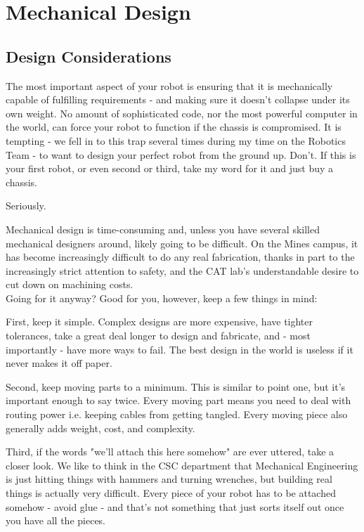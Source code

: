
\chapter{Mechanical Design}
\label{chap:MechDes}


\section{Design Considerations}
The most important aspect of your robot is ensuring that it is mechanically capable of fulfilling requirements - and making sure it doesn't collapse under its own weight. No amount of sophisticated code, nor the most powerful computer in the world, can force your robot to function if the chassis is compromised. It is tempting - we fell in to this trap several times during my time on the Robotics Team - to want to design your perfect robot from the ground up. Don't. If this is your first robot, or even second or third, take my word for it and just buy a chassis.

Seriously.

Mechanical design is time-consuming and, unless you have several skilled mechanical designers around, likely going to be difficult. On the Mines campus, it has become increasingly difficult to do any real fabrication, thanks in part to the increasingly strict attention to safety, and the CAT lab's understandable desire to cut down on machining costs.\\

Going for it anyway? Good for you, however, keep a few things in mind:

First, keep it simple. Complex designs are more expensive, have tighter tolerances, take a great deal longer to design and fabricate, and - most importantly - have more ways to fail. The best design in the world is useless if it never makes it off paper.

Second, keep moving parts to a minimum. This is similar to point one, but it's important enough to say twice. Every moving part means you need to deal with routing power i.e. keeping cables from getting tangled. Every moving piece also generally adds weight, cost, and complexity.

Third, if the words "we'll attach this here somehow" are ever uttered, take a closer look. We like to think in the CSC department that Mechanical Engineering is just hitting things with hammers and turning wrenches, but building real things is actually very difficult. Every piece of your robot has to be attached somehow - avoid glue - and that's not something that just sorts itself out once you have all the pieces.

